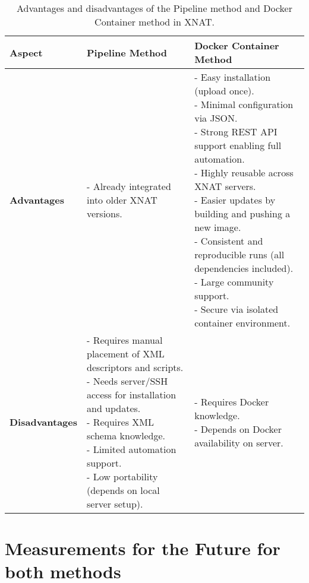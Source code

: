 \begin{table}[htbp]
\centering
\renewcommand{\arraystretch}{1.3}
\begin{tabular}{|p{3cm}|p{6cm}|p{6cm}|}
\hline
\textbf{Aspect} & \textbf{Pipeline Method} & \textbf{Docker Container Method} \\
\hline
\textbf{Advantages} &
\parbox[t]{6cm}{
- Already integrated into older XNAT versions.
}
&
\parbox[t]{6cm}{
- Easy installation (upload once). \\
- Minimal configuration via JSON. \\
- Strong REST API support enabling full automation. \\
- Highly reusable across XNAT servers. \\
- Easier updates by building and pushing a new image. \\
- Consistent and reproducible runs (all dependencies included). \\
- Large community support. \\
- Secure via isolated container environment. \\
} \\
\hline
\textbf{Disadvantages} &
\parbox[t]{6cm}{
- Requires manual placement of XML descriptors and scripts. \\
- Needs server/SSH access for installation and updates. \\
- Requires XML schema knowledge. \\
- Limited automation support. \\
- Low portability (depends on local server setup).\\
}
&
\parbox[t]{6cm}{
- Requires Docker knowledge. \\
- Depends on Docker availability on server.
} \\
\hline
\end{tabular}
\caption{Advantages and disadvantages of the Pipeline method and Docker Container method in XNAT.}
\label{tab:docker_pipeline}
\end{table}



















 
\section{Measurements for the Future for both methods}

